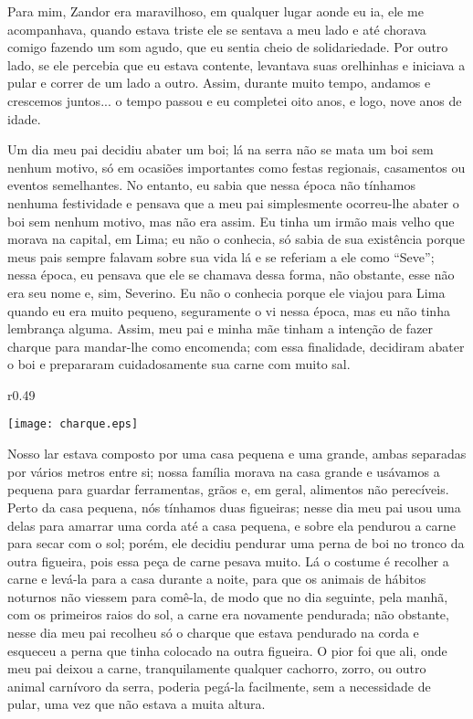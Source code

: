 Para mim, Zandor era maravilhoso, em qualquer lugar aonde eu ia, ele me acompanhava, quando estava triste ele se sentava a meu lado e até chorava comigo fazendo um som agudo, que eu sentia cheio de solidariedade. 
Por outro lado, se ele percebia que eu estava contente, levantava suas orelhinhas e iniciava a pular e correr de um lado a outro. Assim, durante muito tempo, andamos e crescemos juntos... o tempo passou e eu completei oito anos, e logo, nove anos de idade.

Um dia meu pai decidiu abater um boi; lá na serra não se mata um boi sem nenhum motivo, só em ocasiões importantes como festas regionais, casamentos ou eventos semelhantes. No entanto, eu sabia que nessa época não tínhamos nenhuma festividade e pensava que a meu pai simplesmente ocorreu-lhe abater o boi sem nenhum motivo, mas não era assim. 
Eu tinha um irmão mais velho que morava na capital, em Lima; eu não o conhecia, só sabia de sua existência porque meus pais sempre falavam sobre sua vida lá e se referiam a ele como ``Seve''; nessa época, eu pensava que ele se chamava dessa forma, não obstante, esse não era seu nome e, sim, Severino. Eu não o conhecia porque ele viajou para Lima quando eu era muito pequeno, seguramente o vi nessa época, mas eu não tinha lembrança alguma. 
Assim, meu pai e minha mãe tinham a intenção de fazer charque para mandar-lhe como encomenda; com essa finalidade, decidiram abater o boi e prepararam cuidadosamente sua carne com muito sal.

\ifdefined\EnableIncludeImages
\begin{wrapfigure}{r}{0.49\textwidth}
  \begin{center}
  \vspace{-20pt}
    \texttt{[image: charque.eps]}
  \end{center}
  \vspace{-20pt}
\end{wrapfigure}
\fi
Nosso lar estava composto por uma casa pequena e uma grande, ambas separadas por vários metros entre si; nossa família morava na casa grande e usávamos a pequena para guardar ferramentas, grãos e, em geral, alimentos não perecíveis. 
Perto da casa pequena, nós tínhamos duas figueiras; nesse dia meu pai usou uma delas para amarrar uma corda até a casa pequena, e sobre ela pendurou a carne para secar com o sol; porém, ele decidiu pendurar uma perna de boi no tronco da outra figueira, pois essa peça de carne pesava muito.
Lá o costume é recolher a carne e levá-la para a casa durante a noite, para que os animais de hábitos noturnos não viessem para comê-la, de modo que no dia seguinte, pela manhã, com os primeiros raios do sol, a carne era novamente pendurada; não obstante, nesse dia meu pai recolheu só o charque que estava pendurado na corda e esqueceu a perna que tinha colocado na outra figueira. 
O pior foi que ali, onde meu pai deixou a carne, tranquilamente qualquer cachorro, zorro, ou outro animal carnívoro da serra, poderia pegá-la facilmente, sem a necessidade de pular, uma vez que não estava a muita altura.

